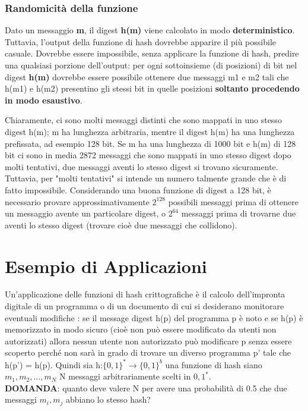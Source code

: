 \subsubsection{Randomicità della funzione}
Dato un messaggio \textbf{m}, il digest \textbf{h(m)} viene calcolato in modo \textbf{deterministico}. Tuttavia, l'output della funzione di hash dovrebbe apparire il più possibile casuale. Dovrebbe essere impossibile, senza applicare la funzione di hash, predire una qualsiasi porzione dell'output: per ogni sottoinsieme (di posizioni) di bit nel digest \textbf{h(m)} dovrebbe essere possibile ottenere due messaggi m1 e m2 tali che h(m1) e h(m2) presentino gli stessi bit in quelle posizioni \textbf{soltanto procedendo in modo esaustivo}. \newline \newline

Chiaramente, ci sono molti messaggi distinti che sono mappati in uno stesso digest h(m); m ha lunghezza arbitraria, mentre il digest h(m) ha una lunghezza prefissata, ad esempio 128 bit. Se m ha una lunghezza di 1000 bit e h(m) di 128 bit ci sono in media 2872 messaggi che sono mappati in uno stesso digest  dopo molti tentativi, due messaggi aventi lo stesso digest si trovano sicuramente. Tuttavia, per "molti tentativi" si intende un numero talmente grande che è di fatto impossibile. Considerando una buona funzione di digest a 128 bit, è necessario provare approssimativamente $2^{128}$ possibili messaggi prima di ottenere un messaggio avente un particolare digest, o $2^{64}$ messaggi prima di trovarne due aventi lo stesso digest (trovare cioè due messaggi che collidono).

\section{Esempio di Applicazioni}
Un’applicazione delle funzioni di hash crittografiche è il calcolo dell’impronta digitale di
un programma o di un documento di cui si desiderano monitorare eventuali modifiche :
se il message digest h(p) del programma p è noto e se h(p) è memorizzato in modo sicuro (cioè non può essere
modificato da utenti non autorizzati) allora nessun utente non autorizzato può modificare p
senza essere scoperto perché non sarà in grado di trovare un diverso programma p’ tale che h(p’) = h(p).
Quindi sia h:$\{0, 1\}^{*} \rightarrow \{0, 1\}^{b}$ una funzione di hash siano $m_{1}, m_{2}, ..., m_{N}$ N messaggi arbitrariamente
scelti in ${0, 1}^{*}$. \\
\textbf{DOMANDA}: quanto deve valere N per avere una probabilità di 0.5 che due messaggi $m_{i}, m_{j}$ abbiano lo stesso hash?

